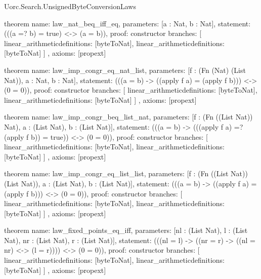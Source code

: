 \begin{lexlean}{Uorc.Search.UnsignedByteConversionLaws}
\begin{semanticmodule}
theorem{
  name: law_nat_beq_iff_eq,
  parameters: [a : Nat, b : Nat],
  statement: (((a =? b) = true) <-> (a = b)),
  proof: constructor{
    branches: [
      linear_arithmetic{definitions: [byteToNat]},
      linear_arithmetic{definitions: [byteToNat]}
    ]
  },
  axioms: [propext]
}

theorem{
  name: law_imp_congr_eq_nat_list,
  parameters: [f : (Fn (Nat) (List Nat)), a : Nat, b : Nat],
  statement: (((a = b) -> ((apply f a) = (apply f b))) <-> (0 = 0)),
  proof: constructor{
    branches: [
      linear_arithmetic{definitions: [byteToNat]},
      linear_arithmetic{definitions: [byteToNat]}
    ]
  },
  axioms: [propext]
}

theorem{
  name: law_imp_congr_beq_list_nat,
  parameters: [f : (Fn ((List Nat)) Nat), a : (List Nat), b : (List Nat)],
  statement: (((a = b) -> (((apply f a) =? (apply f b)) = true)) <-> (0 = 0)),
  proof: constructor{
    branches: [
      linear_arithmetic{definitions: [byteToNat]},
      linear_arithmetic{definitions: [byteToNat]}
    ]
  },
  axioms: [propext]
}

theorem{
  name: law_imp_congr_eq_list_list,
  parameters: [f : (Fn ((List Nat)) (List Nat)), a : (List Nat), b : (List Nat)],
  statement: (((a = b) -> ((apply f a) = (apply f b))) <-> (0 = 0)),
  proof: constructor{
    branches: [
      linear_arithmetic{definitions: [byteToNat]},
      linear_arithmetic{definitions: [byteToNat]}
    ]
  },
  axioms: [propext]
}

theorem{
  name: law_fixed_points_eq_iff,
  parameters: [nl : (List Nat), l : (List Nat), nr : (List Nat), r : (List Nat)],
  statement: (((nl = l) -> ((nr = r) -> ((nl = nr) <-> (l = r)))) <-> (0 = 0)),
  proof: constructor{
    branches: [
      linear_arithmetic{definitions: [byteToNat]},
      linear_arithmetic{definitions: [byteToNat]}
    ]
  },
  axioms: [propext]
}
\end{semanticmodule}
\end{lexlean}
